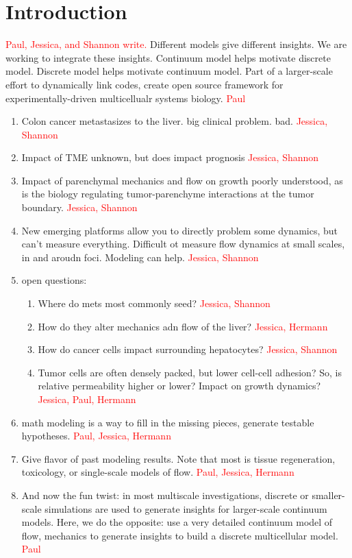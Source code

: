 \documentclass[smallextended,natbib,draft]{svjour3}
\newcommand{\red}[1]{\textcolor{red}{#1}}
\begin{document}
\section{Introduction}
\red{Paul, Jessica, and Shannon write.}
Different models give different insights. We are working to integrate these insights. 
Continuum model helps motivate discrete model. 
Discrete model helps motivate continuum model. 
Part of a larger-scale effort to dynamically link codes, create open source framework 
for experimentally-driven multicellualr systems biology.  \red{Paul}

\begin{enumerate}
\item 
Colon cancer metastasizes to the liver. big clinical problem. bad.  \red{Jessica, Shannon}
\item 
Impact of TME unknown, but does impact prognosis \red{Jessica, Shannon}
\item 
Impact of parenchymal mechanics and flow on growth poorly understood, as is the biology regulating tumor-parenchyme interactions 
at the tumor boundary. \red{Jessica, Shannon}
\item 
New emerging platforms allow you to directly problem some dynamics, but can't measure everything. Difficult ot measure flow dynamics at 
small scales, in and aroudn foci. Modeling can help.  \red{Jessica, Shannon}
\item 
open questions: 
\begin{enumerate}
\item 
Where do mets most commonly seed? \red{Jessica, Shannon}
\item
How do they alter mechanics adn flow of the liver? \red{Jessica, Hermann}
\item 
How do cancer cells impact surrounding hepatocytes? \red{Jessica, Shannon}
\item 
Tumor cells are often densely packed, but lower cell-cell adhesion? So, is relative permeability higher or lower? Impact on growth 
dynamics? \red{Jessica, Paul, Hermann}
\end{enumerate}
\item 
math modeling is a way to fill in the missing pieces, generate testable hypotheses. \red{Paul, Jessica, Hermann}
\item 
Give flavor of past modeling results. Note that most is tissue regeneration, toxicology, or single-scale models of flow.  
\red{Paul, Jessica, Hermann}
\item 
And now the fun twist: in most multiscale investigations, discrete or smaller-scale simulations are used to generate insights for 
larger-scale continuum models. Here, we do the opposite: use a very detailed continuum model of flow, mechanics to generate insights 
to build a discrete multicellular model. \red{Paul}
\end{enumerate}
\end{document}
